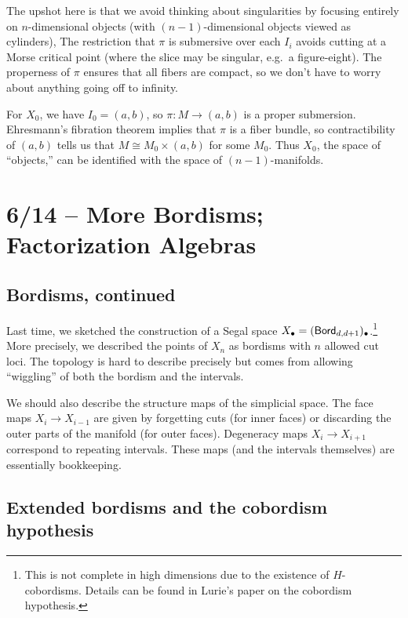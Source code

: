 The upshot here is that we avoid thinking about singularities by focusing entirely on $n$-dimensional objects (with $(n-1)$-dimensional objects viewed as cylinders),
The restriction that $\pi$ is submersive over each $I_i$ avoids cutting at a Morse critical point (where the slice may be singular, e.g.\ a figure-eight).
The properness of $\pi$ ensures that all fibers are compact, so we don't have to worry about anything going off to infinity.

\begin{ex}
	For $X_0$, we have $I_0 = (a, b)$, so $\pi: M \to (a, b)$ is a proper submersion.
	Ehresmann's fibration theorem implies that $\pi$ is a fiber bundle, so contractibility of $(a, b)$ tells us that $M \cong M_0 \times (a, b)$ for some $M_0$.
	Thus $X_0$, the space of ``objects,'' can be identified with the space of $(n-1)$-manifolds.
\end{ex}

\section{6/14 -- More Bordisms; Factorization Algebras}

\subsection{Bordisms, continued}

Last time, we sketched the construction of a Segal space $X_\bullet = (\mathsf{Bord}_{d,d+1})_\bullet$.\footnote{This is not complete in high dimensions due to the existence of $H$-cobordisms.
Details can be found in Lurie's paper on the cobordism hypothesis.}
More precisely, we described the points of $X_n$ as bordisms with $n$ allowed cut loci.
The topology is hard to describe precisely but comes from allowing ``wiggling'' of both the bordism and the intervals.

We should also describe the structure maps of the simplicial space.
The face maps $X_i \to X_{i-1}$ are given by forgetting cuts (for inner faces) or discarding the outer parts of the manifold (for outer faces).
Degeneracy maps $X_i \to X_{i+1}$ correspond to repeating intervals.
These maps (and the intervals themselves) are essentially bookkeeping.

\subsection{Extended bordisms and the cobordism hypothesis}

